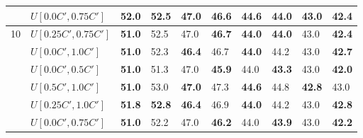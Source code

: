 \begin{table}[h]
{\begin{tabular}{|l|l||l|l||l|l||l|l||l|l|}
       & $U[0.0C',0.75C']$ & \textbf{52.0} & 52.5 		& 47.0 & \textbf{46.6} 		& 44.6 & \textbf{44.0} 		& 43.0 & \textbf{42.4}\\
      \hline\hline
      \multirow{6}{*}{10}
       & $U[0.25C',0.75C']$ & \textbf{51.0} & 52.5 		& 47.0 & \textbf{46.7} 		& \textbf{44.0} & \textbf{44.0} 		& 43.0 & \textbf{42.4}\\
       & $U[0.0C',1.0C']$ & \textbf{51.0} & 52.3 			& \textbf{46.4} & 46.7 		& \textbf{44.0} & 44.2 		& 43.0 & \textbf{42.7}\\
       & $U[0.0C',0.5C']$ & \textbf{51.0} & 51.3 			& 47.0 & \textbf{45.9} 		& 44.0 & \textbf{43.3} 		& 43.0 & \textbf{42.0}\\
       & $U[0.5C',1.0C']$ & \textbf{51.0} & 53.0 			& \textbf{47.0} & 47.3 		& \textbf{44.6} & 44.8 		& \textbf{42.8} & 43.0\\
       & $U[0.25C',1.0C']$ & \textbf{51.8} & \textbf{52.8} & \textbf{46.4} & 46.9 	& \textbf{44.0} & 44.2 		& 43.0 & \textbf{42.8}\\
       & $U[0.0C',0.75C']$ & \textbf{51.0} & 52.2 			& 47.0 & \textbf{46.2} 		& 44.0 & \textbf{43.9} 		& 43.0 & \textbf{42.2}\\
      \hline
      \end{tabular}
      }
      \label{tab:inCompared}\end{table}
